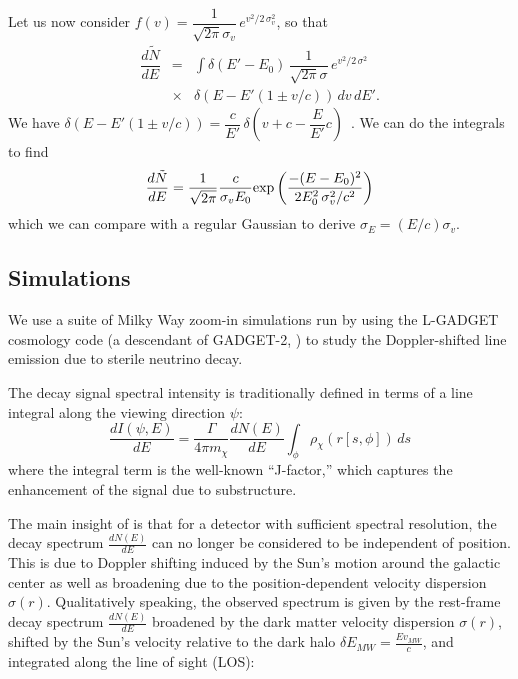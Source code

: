 \documentclass[aps,prl,10pt,twocolumn,superscriptaddress,showpacs]{revtex4-1}
\begin{document}
Let us now consider $f(v) = \dfrac{1}{\sqrt{2\pi} \sigma_v} \, e^{v^2/2 \, \sigma_v^2}$, so that
\begin{eqnarray}
\dfrac{d\tilde{N}}{dE} &=& \int \delta(E' - E_0) \, \dfrac{1}{\sqrt{2\pi} \sigma} \, e^{v^2/2 \, \sigma^2} \, \nonumber\\
&\times& \delta (E - E' (1 \pm v/c)) \, dv \, dE'.
\label{eq:step2}
\end{eqnarray}
We have $\delta (E - E' (1 \pm v/c)) = \dfrac{c}{E'} \, \delta \left(v + c - \dfrac{E}{E'} c \right)$\, .  We can do the integrals to find
\begin{eqnarray}
\dfrac{d\tilde{N}}{dE} =  \dfrac{1}{\sqrt{2\pi}} \dfrac{c}{\sigma_v E_0} {\rm exp} \left( \dfrac{-(E-E_0)^2}{2 E_0^2 \, \sigma_v^2/c^2} \right)
\label{eq:step3}
\end{eqnarray}
which we can compare with a regular Gaussian to derive $\sigma_E = (E/c) \sigma_v$.

\subsection{Simulations}
\label{sec:simulations}


We use a suite of Milky Way zoom-in simulations run by \cite{mao2015} using the L-GADGET cosmology code
(a descendant of GADGET-2, \cite{springel2005}) to study the Doppler-shifted line emission due to sterile neutrino decay. 

The decay signal spectral intensity is traditionally defined in terms of a line integral along the viewing direction $\psi$:
\begin{equation}
\frac{dI(\psi, E)}{dE} = \frac{\Gamma}{4 \pi m_\chi} \frac{dN(E)}{dE} \int_\phi \rho_\chi(r[s,\phi]) \, ds
\end{equation}
where the integral term is the well-known ``J-factor,'' which captures the enhancement of the 
signal due to substructure.

The main insight of \cite{speckhard2016} is that for a detector with sufficient spectral
resolution, the decay spectrum $\frac{dN(E)}{dE}$ can no longer be considered to be independent of
position.  This is due to Doppler shifting induced by the Sun's motion around the galactic center
as well as broadening due to the position-dependent velocity dispersion $\sigma(r)$.
Qualitatively speaking, the observed spectrum is given by the rest-frame decay spectrum
$\frac{dN(E)}{dE}$ broadened by the dark matter velocity dispersion $\sigma(r)$, shifted by the Sun's velocity 
relative to the dark halo $\delta E_{MW} = \frac{E v_{MW}}{c}$, and integrated along the line of sight (LOS):
\end{document}
